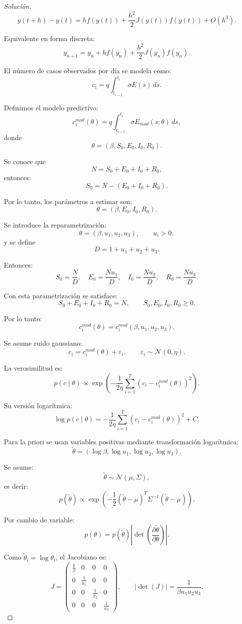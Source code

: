\documentclass[12pt,spanish,mexico]{article}
\numberwithin{equation}{section}
\theoremstyle{definition}
\theoremstyle{remark}
\newenvironment{solution}{\begin{proof}[Solución]}{\end{proof}}
\begin{document}
\begin{solution}
\[
y(t+h)-y(t)
=
h f(y(t))
+
\frac{h^2}{2}J(y(t))f(y(t))
+
O(h^3).
\]

Equivalente en forma discreta:
\[
y_{n+1}
=
y_n
+
h f(y_n)
+
\frac{h^2}{2}J(y_n)f(y_n).
\]

El número de casos observados por día se modela como:
\[
c_i = q \int_{t_{i-1}}^{t_i} \sigma E(s)\,ds.
\]

Definimos el modelo predictivo:
\[
c_i^{mod}(\theta) = q \int_{t_{i-1}}^{t_i} \sigma E_{mod}(s;\theta)\,ds,
\]
donde
\[
\theta = (\beta, S_0, E_0, I_0, R_0).
\]

Se conoce que
\[
N = S_0 + E_0 + I_0 + R_0,
\]
entonces:
\[
S_0 = N - (E_0 + I_0 + R_0).
\]

Por lo tanto, los parámetros a estimar son:
\[
\theta = (\beta, E_0, I_0, R_0).
\]

Se introduce la reparametrización:
\[
\theta = (\beta, u_1, u_2, u_3), \qquad u_i > 0,
\]
y se define
\[
D = 1 + u_1 + u_2 + u_3.
\]

Entonces:
\[
S_0 = \frac{N}{D}, \quad
E_0 = \frac{N u_1}{D}, \quad
I_0 = \frac{N u_2}{D}, \quad
R_0 = \frac{N u_3}{D}.
\]

Con esta parametrización se satisface:
\[
S_0 + E_0 + I_0 + R_0 = N, \qquad S_0,E_0,I_0,R_0 \ge 0.
\]

Por lo tanto:
\[
c_i^{mod}(\theta) = c_i^{mod}(\beta, u_1, u_2, u_3).
\]

Se asume ruido gaussiano:
\[
c_i = c_i^{mod}(\theta) + \varepsilon_i,
\qquad
\varepsilon_i \sim \mathcal{N}(0,\eta).
\]

La verosimilitud es:
\[
p(c \mid \theta)
\propto
\exp\left(
-\frac{1}{2\eta}\sum_{i=1}^T (c_i - c_i^{mod}(\theta))^2
\right).
\]

Su versión logarítmica:
\[
\log p(c \mid \theta)
=
-\frac{1}{2\eta}\sum_{i=1}^T (c_i - c_i^{mod}(\theta))^2 + C.
\]

Para la priori se usan variables positivas mediante transformación logarítmica:
\[
\tilde{\theta} = (\log \beta, \log u_1, \log u_2, \log u_3).
\]

Se asume:
\[
\tilde{\theta} \sim \mathcal{N}(\mu, \Sigma),
\]
es decir:
\[
p(\tilde{\theta})
\propto
\exp\left(
-\frac{1}{2}(\tilde{\theta}-\mu)^T \Sigma^{-1} (\tilde{\theta}-\mu)
\right).
\]

Por cambio de variable:
\[
p(\theta)
=
p(\tilde{\theta})
\left|
\det\left(\frac{\partial \tilde{\theta}}{\partial \theta}\right)
\right|.
\]

Como \(\tilde{\theta}_i = \log \theta_i\), el Jacobiano es:
\[
J =
\begin{pmatrix}
\frac{1}{\beta} & 0 & 0 & 0 \\
0 & \frac{1}{u_1} & 0 & 0 \\
0 & 0 & \frac{1}{u_2} & 0 \\
0 & 0 & 0 & \frac{1}{u_3}
\end{pmatrix},
\qquad
|\det(J)| = \frac{1}{\beta u_1 u_2 u_3}.
\]


\end{solution}
\end{document}
